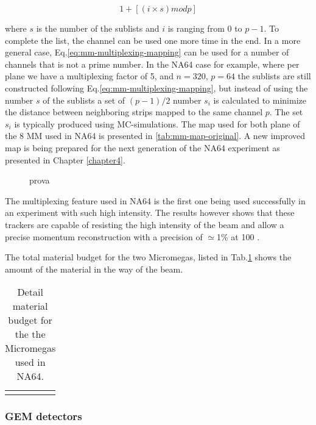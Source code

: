 \begin{equation}
  \label{eq:mm-multiplexing-mapping}
  1 + [(i \times s) mod p]
\end{equation}

where $s$ is the number of the sublists and $i$ is ranging from 0 to $p-1$. To complete the list, the channel can be used one more time in the end. In a more general case, Eq.\ref{eq:mm-multiplexing-mapping} can be used for a number of channels that is not a prime number. In the NA64 case for example, where per plane we have a multiplexing factor of 5, and $n=320$, $p=64$ the sublists are still constructed following Eq.\ref{eq:mm-multiplexing-mapping}, but instead of using the number $s$ of the sublists a set of $(p-1)/2$ number $s_i$ is calculated to minimize the distance between neighboring strips mapped to the same channel $p$. The set $s_i$ is typically produced using MC-simulations. The map used for both plane of the 8 MM used in NA64 is presented in \ref{tab:mm-map-original}. A new improved map is being prepared for the next generation of the NA64 experiment as presented in Chapter \ref{chapter4}.

\begin{figure}[bth!]
  \centering
  
  \caption[example of the readout of a multiplexing detector]{prova}
  \label{fig:multiplexing-example}
\end{figure}

The multiplexing feature used in NA64 is the first one being used successfully in an experiment with such high intensity. The results however shows that these trackers are capable of resisting the high intensity of the beam and allow a precise momentum reconstruction with a precision of $\simeq$1\% at 100 \si{\gev} \cite{Banerjee:2017mdu}.

The total material budget for the two Micromegas, listed in Tab.\ref{tab:mm-mbudget} shows the amount of the material in the way of the beam. 

  \begin{table}[bth!]
    \centering
    \begin{tabular}{|l|c|c|}
      &&
    \end{tabular}
    \caption[material budget MM]{Detail material budget for the the Micromegas used in NA64.}
    \label{tab:mm-mbudget}
  \end{table}

  \subsubsection{GEM detectors}

